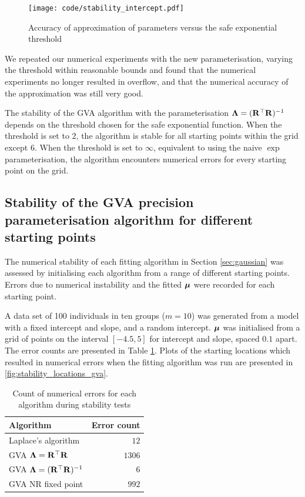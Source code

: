\begin{figure}[h]
	\texttt{[image: code/stability\_intercept.pdf]}
	\label{fig:stability_accuracy}
	\caption{Accuracy of approximation of parameters versus the safe exponential threshold}
\end{figure}

We repeated our numerical experiments with the new parameterisation, varying
the threshold within reasonable bounds and found that the numerical experiments
no longer resulted in overflow, and that the numerical accuracy of the
approximation was still very good.

The stability of the GVA algorithm with the parameterisation ${\boldsymbol \Lambda} =
({\bf R}^\top {\bf R})^{-1}$ depends on the threshold chosen for the safe exponential
function. When the threshold is set to $2$, the algorithm is stable for all
starting points within the grid except $6$. When the threshold is set to
$\infty$, equivalent to using the naive $\exp$ parameterisation, the algorithm
encounters numerical errors for every starting point on the  grid.
	
\subsection{Stability of the GVA precision parameterisation algorithm for different starting points}
The numerical stability of each fitting algorithm in Section \ref{sec:gaussian}
was assessed by initialising each algorithm from a range of different starting
points. Errors due to numerical instability and the fitted ${\boldsymbol \mu}$ were recorded
for each starting point.
		
A data set of 100 individuals in ten groups ($m=10$) was generated from a model
with a fixed intercept and slope, and a random intercept. ${\boldsymbol \mu}$ was
initialised from a grid of points on the interval $[-4.5, 5]$ for intercept and
slope, spaced $0.1$ apart. The error counts are presented in Table
\ref{tab:stability_results}. Plots of the starting locations which resulted in
numerical errors when the fitting algorithm was run are presented in
\ref{fig:stability_locations_gva}.
		
\begin{table}
	\begin{tabular}{|l|r|}
		\hline
		Algorithm                            & Error count \\
		\hline
		Laplace's algorithm                  & $12$          \\
		GVA ${\boldsymbol \Lambda} = {\bf R}^\top {\bf R}$        & $1306$       \\
		GVA ${\boldsymbol \Lambda} = ({\bf R}^\top {\bf R})^{-1}$ & $6$           \\
		GVA NR fixed point                   & $992$         \\
		\hline
	\end{tabular}
	\caption{Count of numerical errors for each algorithm during stability tests}
	\label{tab:stability_results}
\end{table}

